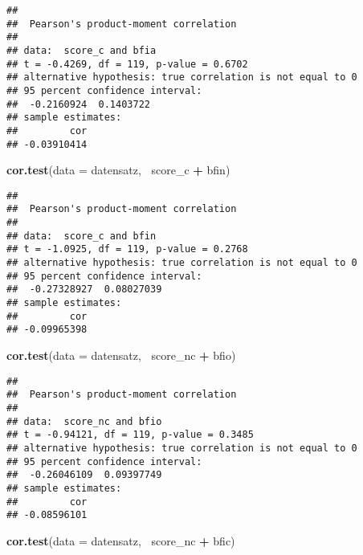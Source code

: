\documentclass[]{article}
\newenvironment{Shaded}{\begin{snugshade}}{\end{snugshade}}
\newcommand{\KeywordTok}[1]{\textcolor[rgb]{0.13,0.29,0.53}{\textbf{#1}}}
\newcommand{\DataTypeTok}[1]{\textcolor[rgb]{0.13,0.29,0.53}{#1}}
\newcommand{\StringTok}[1]{\textcolor[rgb]{0.31,0.60,0.02}{#1}}
\newcommand{\OperatorTok}[1]{\textcolor[rgb]{0.81,0.36,0.00}{\textbf{#1}}}
\newcommand{\NormalTok}[1]{#1}
\begin{document}
\begin{verbatim}
## 
##  Pearson's product-moment correlation
## 
## data:  score_c and bfia
## t = -0.4269, df = 119, p-value = 0.6702
## alternative hypothesis: true correlation is not equal to 0
## 95 percent confidence interval:
##  -0.2160924  0.1403722
## sample estimates:
##         cor 
## -0.03910414
\end{verbatim}

\begin{Shaded}
\begin{Highlighting}[]
\KeywordTok{cor.test}\NormalTok{(}\DataTypeTok{data =}\NormalTok{ datensatz, }\OperatorTok{~}\NormalTok{score_c }\OperatorTok{+}\StringTok{ }\NormalTok{bfin)}
\end{Highlighting}
\end{Shaded}

\begin{verbatim}
## 
##  Pearson's product-moment correlation
## 
## data:  score_c and bfin
## t = -1.0925, df = 119, p-value = 0.2768
## alternative hypothesis: true correlation is not equal to 0
## 95 percent confidence interval:
##  -0.27328927  0.08027039
## sample estimates:
##         cor 
## -0.09965398
\end{verbatim}

\begin{Shaded}
\begin{Highlighting}[]
\KeywordTok{cor.test}\NormalTok{(}\DataTypeTok{data =}\NormalTok{ datensatz, }\OperatorTok{~}\NormalTok{score_nc }\OperatorTok{+}\StringTok{ }\NormalTok{bfio)}
\end{Highlighting}
\end{Shaded}

\begin{verbatim}
## 
##  Pearson's product-moment correlation
## 
## data:  score_nc and bfio
## t = -0.94121, df = 119, p-value = 0.3485
## alternative hypothesis: true correlation is not equal to 0
## 95 percent confidence interval:
##  -0.26046109  0.09397749
## sample estimates:
##         cor 
## -0.08596101
\end{verbatim}

\begin{Shaded}
\begin{Highlighting}[]
\KeywordTok{cor.test}\NormalTok{(}\DataTypeTok{data =}\NormalTok{ datensatz, }\OperatorTok{~}\NormalTok{score_nc }\OperatorTok{+}\StringTok{ }\NormalTok{bfic)}
\end{Highlighting}
\end{Shaded}
\end{document}
